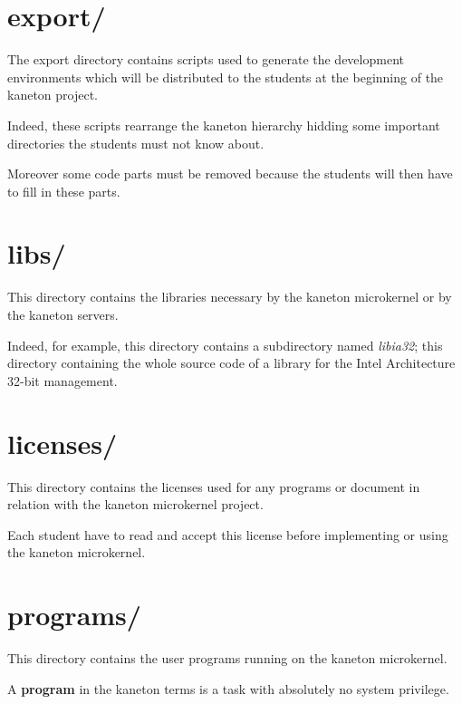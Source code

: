 %
%

\section{export/}

The export directory contains scripts used to generate the
development environments which will be distributed to the students
at the beginning of the kaneton project.

Indeed, these scripts rearrange the kaneton hierarchy hidding some
important directories the students must not know about.

Moreover some code parts must be removed because the students will
then have to fill in these parts.

%
%

\section{libs/}

This directory contains the libraries necessary by the kaneton microkernel
or by the kaneton servers.

Indeed, for example, this directory contains a subdirectory named
\textit{libia32}; this directory containing the whole source code of
a library for the Intel Architecture 32-bit management.

%
%

\section{licenses/}

This directory contains the licenses used for any programs or document
in relation with the kaneton microkernel project.

Each student have to read and accept this license before implementing
or using the kaneton microkernel.

%
%

\section{programs/}

This directory contains the user programs running on the kaneton
microkernel.

A \textbf{program} in the kaneton terms is a task with absolutely no
system privilege.

%
%

